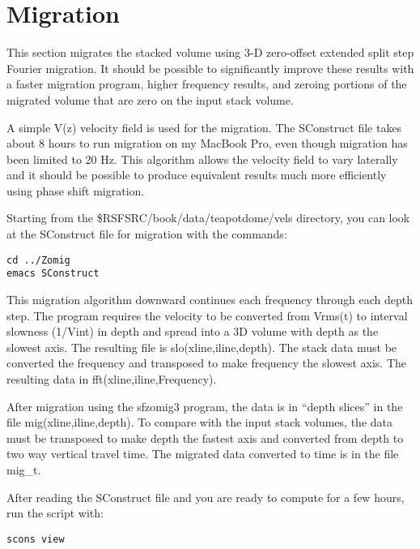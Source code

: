 

\section{Migration}

This section migrates the stacked volume using 3-D zero-offset extended split step Fourier migration.  It should be possible to significantly improve these results with a faster migration program, higher frequency results, and zeroing portions of the migrated volume that are zero on the input stack volume.

A simple V(z) velocity field is used for the migration.  The SConstruct file takes about 8 hours to run migration on my MacBook Pro, even though migration has been limited to 20 Hz.   This algorithm allows the velocity field to vary laterally and it should be possible to produce equivalent results much more efficiently using phase shift migration.
 
Starting from the \$RSFSRC/book/data/teapotdome/vels directory, you can look at the SConstruct file for migration with the commands:
\begin{verbatim}  
cd ../Zomig
emacs SConstruct
\end{verbatim}  

This migration algorithm downward continues each frequency through each depth step.  The program requires the velocity to be converted from Vrms(t) to interval slowness (1/Vint) in depth and spread into a 3D volume with depth as the slowest axis.  The resulting file is slo(xline,iline,depth).  The stack data must be converted the frequency and transposed to make frequency the slowest axis.  The resulting data in fft(xline,iline,Frequency).  
 
After migration using the sfzomig3 program, the data is in “depth slices” in the file mig(xline,iline,depth).  To compare with the input stack volumes, the data must be transposed to make depth the fastest axis and converted from depth to two way vertical travel time.  The migrated data converted to time is in the file mig\_t.

After reading the SConstruct file and you are ready to compute for a few hours, run the script with:
\begin{verbatim}  
scons view
\end{verbatim}  

